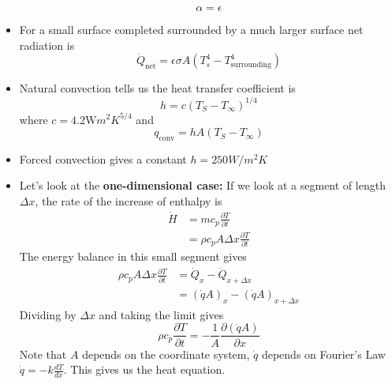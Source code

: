 \documentclass{article}
\begin{document}
\begin{itemize}
        \begin{equation}
            \alpha = \epsilon
        \end{equation}
        \item For a small surface completed surrounded by a much larger surface net radiation is 
        \begin{equation}
            \dot{Q}_\text{net} = \epsilon \sigma A (T_s^4 - T_\text{surrounding}^4)
        \end{equation}
        \item Natural convection tells us the heat transfer coefficient is
        \begin{equation}
            h = c(T_S-T_\infty)^{1/4}
        \end{equation}
        where $c=4.2 \text{W}{m^2 K^{5/4}}$ and 
        \begin{equation}
            q_\text{conv}  = hA(T_S-T_\infty)
        \end{equation}
        \item Forced convection gives a constant $h = 250 W/m^2 K$
        \item Let's look at the \textbf{one-dimensional case:} If we look at a segment of length $\Delta x$, the rate of the increase of enthalpy is
        \begin{align}
            \dot{H} &= mc_p \frac{\partial T}{\partial t} \\ 
            &= \rho c_p A \Delta x \frac{\partial T}{\partial t}
        \end{align}
        The energy balance in this small segment gives
        \begin{align}
            \rho c_p A\Delta x\frac{\partial T}{\partial t} &= \dot{Q}_x - \dot{Q}_{x+\Delta x} \\ 
            &= (\dot{q}A)_x - (\dot{q}A)_{x+\Delta x}
        \end{align}
        Dividing by $\Delta x$ and taking the limit gives 
        \begin{equation}
            \rho c_p \frac{\partial T}{\partial t} = -\frac{1}{A} \frac{\partial(\dot{q}A)}{\partial x}
        \end{equation}
        Note that $A$ depends on the coordinate system, $\dot{q}$ depends on Fourier's Law $\dot{q} = -k\frac{dT}{dx}$. This gives us the heat equation.
    \end{itemize}
\end{document}

